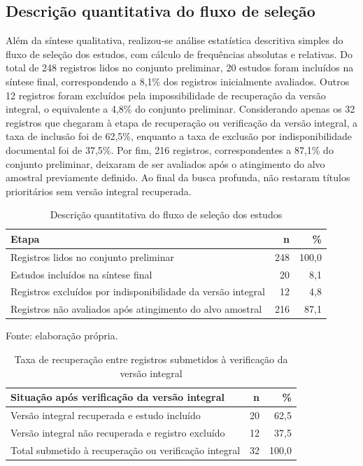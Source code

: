 \documentclass[12pt,a4paper]{article}
\begin{document}
\subsection{Descrição quantitativa do fluxo de seleção}
\label{sec:org82f415a}

Além da síntese qualitativa, realizou-se análise estatística descritiva simples do fluxo de seleção dos estudos, com cálculo de frequências absolutas e relativas. Do total de 248 registros lidos no conjunto preliminar, 20 estudos foram incluídos na síntese final, correspondendo a 8,1\% dos registros inicialmente avaliados. Outros 12 registros foram excluídos pela impossibilidade de recuperação da versão integral, o equivalente a 4,8\% do conjunto preliminar. Considerando apenas os 32 registros que chegaram à etapa de recuperação ou verificação da versão integral, a taxa de inclusão foi de 62,5\%, enquanto a taxa de exclusão por indisponibilidade documental foi de 37,5\%. Por fim, 216 registros, correspondentes a 87,1\% do conjunto preliminar, deixaram de ser avaliados após o atingimento do alvo amostral previamente definido. Ao final da busca profunda, não restaram títulos prioritários sem versão integral recuperada.

\begin{table}[htbp]
\caption{Descrição quantitativa do fluxo de seleção dos estudos}
\centering
\footnotesize
\begin{tabular}{@{}p{}rr@{}}
Etapa & n & \%\\
\hline
Registros lidos no conjunto preliminar & 248 & 100,0\\
Estudos incluídos na síntese final & 20 & 8,1\\
Registros excluídos por indisponibilidade da versão integral & 12 & 4,8\\
Registros não avaliados após atingimento do alvo amostral & 216 & 87,1\\
\end{tabular}
\end{table}

Fonte: elaboração própria.

\begin{table}[htbp]
\caption{Taxa de recuperação entre registros submetidos à verificação da versão integral}
\centering
\footnotesize
\begin{tabular}{@{}p{}rr@{}}
Situação após verificação da versão integral & n & \%\\
\hline
Versão integral recuperada e estudo incluído & 20 & 62,5\\
Versão integral não recuperada e registro excluído & 12 & 37,5\\
Total submetido à recuperação ou verificação integral & 32 & 100,0\\
\end{tabular}
\end{table}
\end{document}
